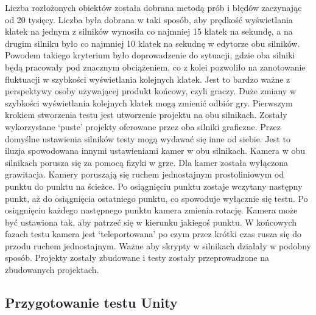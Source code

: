 \documentclass[12pt,twoside]{article}
\begin{document}
Liczba rozłożonych obiektów została dobrana metodą prób i błędów zaczynając od
20 tysięcy. Liczba była dobrana w taki sposób, aby prędkość wyświetlania klatek
na jednym z silników wynosiła co najmniej 15 klatek na sekundę, a na drugim
silniku było co najmniej 10 klatek na sekudnę w edytorze obu silników. Powodem
takiego kryterium było doprowadzenie do sytuacji, gdzie oba silniki będą
pracowały pod znacznym obciążeniem, co z kolei pozwoliło na zanotowanie
fluktuacji w szybkości wyświetlania kolejnych klatek. Jest to bardzo ważne z
perspektywy osoby używającej produkt końcowy, czyli graczy. Duże zmiany w
szybkości wyświetlania kolejnych klatek mogą zmienić odbiór gry. Pierwszym
krokiem stworzenia testu jest utworzenie projektu na obu silnikach. Zostały
wykorzystane ‘puste’ projekty oferowane przez oba silniki graficzne. Przez
domyślne ustawienia silników testy mogą wydawać się inne od siebie. Jest to
iluzja spowodowana innymi ustawieniami kamer w obu silnikach. Kamera w obu
silnikach porusza się za pomocą fizyki w grze. Dla kamer została wyłączona
grawitacja.  Kamery poruszają się ruchem jednostajnym prostoliniowym od punktu
do punktu na ścieżce. Po osiągnięciu punktu zostaje wczytany następny punkt, aż
do osiągnięcia ostatniego punktu, co spowoduje wyłącznie się testu. Po
osiągnięciu każdego następnego punktu kamera zmienia rotację. Kamera może być
ustawiona tak, aby patrzeć się w kierunku jakiegoś punktu. W końcowych fazach
testu kamera jest ‘teleportowana’ po czym przez krótki czas rusza się do przodu
ruchem jednostajnym. Ważne aby skrypty w silnikach działały w podobny sposób.
Projekty zostały zbudowane i testy zostały przeprowadzone na zbudowanych
projektach. 


\subsection{Przygotowanie testu Unity}
\end{document}
